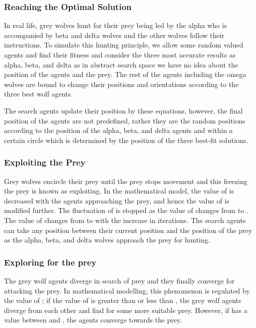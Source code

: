 \documentclass{llncs}
\begin{document}
\subsubsection{Reaching the Optimal Solution}
In real life, grey wolves hunt for their prey being led by the alpha who is accompanied by beta and delta wolves and the other wolves follow their instructions. To simulate this hunting principle, we allow some random valued agents and find their fitness and consider the three most accurate results as alpha, beta, and delta as in abstract search space we have no idea about the position of the agents and the prey.  The rest of the agents including the omega wolves are bound to change their positions and orientations according to the three best wolf agents.







The search agents update their position by these equations, however, the final position of the agents are not predefined, rather they are the random positions according to the position of the alpha, beta, and delta agents and within a certain circle which is determined by the position of the three best-fit solutions.
\subsubsection{Exploiting the Prey}
Grey wolves encircle their prey until the prey stops movement and this freezing the prey is known as exploiting. In the mathematical model, the value of  is decreased with the agents approaching the prey, and hence the value of  is modified further. The fluctuation of  is stopped as the value of  changes from  to . The value of  changes from  to  with the increase in iterations. The search agents can take any position between their current position and the position of the prey as the alpha, beta, and delta wolves approach the prey for hunting.
\subsubsection{Exploring for the prey}
The grey wolf agents diverge in search of prey and they finally converge for attacking the prey. In mathematical modelling, this phenomenon is regulated by the value of ; if the value of  is greater than  or less than , the grey wolf agents diverge from each other and find for some more suitable prey. However, if  has a value between  and , the agents converge towards the prey.
\end{document}
